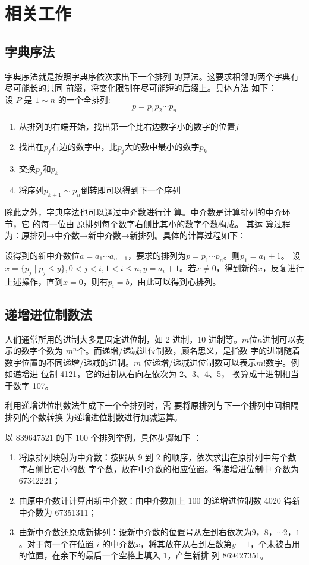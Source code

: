 \documentclass[6pt, twocolumn]{ctexart}
\begin{document}
\section{相关工作}
\subsection{字典序法}
字典序法就是按照字典序依次求出下一个排列 的算法。这要求相邻的两个字典有尽可能长的共同 前缀，将变化限制在尽可能短的后缀上。具体方法 如下：\\
设 $P$ 是 $1\sim n$ 的一个全排列:\\
\begin{displaymath}
p=p_1p_2\cdots p_n
\end{displaymath}

\begin{enumerate}
  \item 从排列的右端开始，找出第一个比右边数字小的数字的位置$j$
  \item 找出在$p_j$右边的数字中，比$p_j$大的数中最小的数字$p_k$
  \item 交换$p_j$和$p_k$
  \item 将序列$p_{k+1}\sim p_{n}$倒转即可以得到下一个序列 
\end{enumerate}	

除此之外，字典序法也可以通过中介数进行计 算。中介数是计算排列的中介环节，它 的每一位由 原排列每个数字右侧比其小的数字个数构成。 其运 算过程为：原排列→中介数→新中介数→新排列。具体的计算过程如下：

设得到的新中介数位$a = a_1\cdots a_{n-1}$，要求的排列为$p = p_1\cdots p_n$。则$p_1 = a_1 +1$。
设$x = \{p_j \mid p_j \le y\}, 0<j<i,1<i\le n,y=a_i + 1$。若$x \ne 0$，得到新的$x$，反复进行上述操作，直到$x=0$，则有$p_i = b$，由此可以得到心排列。
\subsection{递增进位制数法}
人们通常所用的进制大多是固定进位制，如 2 进制，10 进制等。$m$位$n$进制可以表示的数字个数为 $m^n$个。而递增/递减进位制数，顾名思义，是指数 字的进制随着数字位置的不同递增/递减的进制。$m$ 位递增/递减进位制数可以表示$m!$数字。例如递增进 位制 4121，它的进制从右向左依次为 2、3、4、5， 换算成十进制相当于数字 107。

利用递增进位制数法生成下一个全排列时，需 要将原排列与下一个排列中间相隔排列的个数转换 为递增进位制数进行加减运算。

以 839647521 的下 100 个排列举例，具体步骤如下 ：
\begin{enumerate}
\item 将原排列映射为中介数：按照从 9 到 2 的顺序，依次求出在原排列中每个数字右侧比它小的数 字个数，放在中介数的相应位置。得递增进位制中 介数为 67342221；
\item 由原中介数计计算出新中介数：由中介数加上 100 的递增进位制数 4020 得新中介数为 67351311；
\item 由新中介数还原成新排列：设新中介数的位置号从左到右依次为$9，8，\cdots 2，1$。对于每一个在位置 $i$ 的中介数$x$，将其放在从右到左数第$y+1$，个未被占用 的位置，在余下的最后一个空格上填入 1，产生新排 列 869427351。
\end{enumerate}
\end{document}
